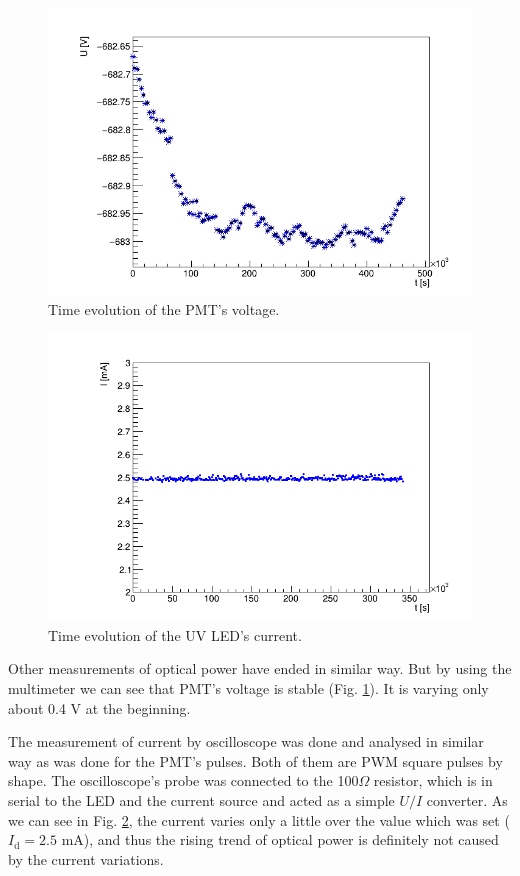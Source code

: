 \begin{figure}[H]
 \centering
 \includegraphics[scale=0.5]{./pictures/voltage}
 \caption{Time evolution of the PMT's voltage.}
 \label{PMTVolt}
\end{figure}

\begin{figure}[H]
 \centering
 \includegraphics[scale=0.5]{./pictures/Current}
 \caption{Time evolution of the UV LED's current.}
 \label{LEDCurrent}
\end{figure}

Other measurements of optical power have ended in similar way. But by using the multimeter we can see that PMT's voltage is stable (Fig. \ref{PMTVolt}). It is varying only about 0.4 V at the beginning.
\par
The measurement of current by oscilloscope was done and analysed in similar way as was done for the PMT's pulses. Both of them are PWM square pulses by shape. The oscilloscope's probe was connected to the 100$\Omega$ resistor, which is in serial to the LED and the current source and acted as a simple $U/I$ converter. As we can see in Fig. \ref{LEDCurrent}, the current varies only a little over the value which was set ($I_\textrm{d} = 2.5$ mA), and thus the rising trend of optical power is definitely not caused by the current variations.

